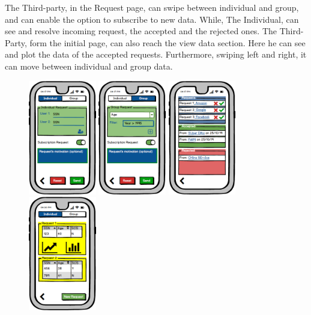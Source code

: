 \documentclass[a4paper]{article}
\begin{document}
The Third-party, in the Request page, can swipe between individual and group, and can enable the option to subscribe to new data. 
\newline
While, The Individual, can see and resolve incoming request, the accepted and the rejected ones.
\newline
The Third- Party, form the initial page, can also reach the view data section. Here he can see and plot the data of the accepted requests. Furthermore, swiping left and right, it can move between individual and group data.



        \begin{figure}[!htpb]

    	\centering
    	\includegraphics[height=50mm]{images/mockups/Requests.png}
    	\includegraphics[height=50mm]{images/mockups/GroupRequest.png}
    	\includegraphics[height=50mm]{images/mockups/ManageRequests.png}
    	\includegraphics[height=50mm]{images/mockups/ViewData.png}

\end{figure}
\end{document}
